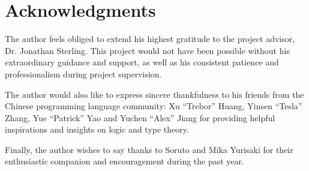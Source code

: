 
\chapter*{Acknowledgments}

The author feels obliged to extend his highest gratitude to the project advisor, Dr. Jonathan Sterling. This project would not have been possible without his extraordinary guidance and support, as well as his consistent patience and professionalism during project supervision.

The author would also like to express sincere thankfulness to his friends from the Chinese programming language community: Xu ``Trebor'' Huang, Yinsen ``Tesla'' Zhang, Yue ``Patrick'' Yao and Yuchen ``Alex'' Jiang for providing helpful inspirations and insights on logic and type theory.

Finally, the author wishes to say thanks to Soruto and Mika Yurisaki for their enthusiastic companion and encouragement during the past year. 
